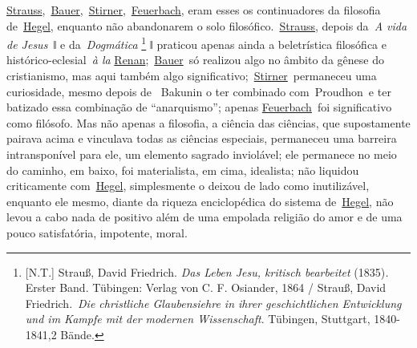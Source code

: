 \href{https://www.marxists.org/portugues/dicionario/verbetes/s/strauss_david.htm}{Strauss},~\href{https://www.marxists.org/portugues/dicionario/verbetes/b/bauer-b.htm}{Bauer},~\href{https://www.marxists.org/portugues/dicionario/verbetes/s/stirner.htm}{Stirner},~\href{https://www.marxists.org/portugues/dicionario/verbetes/f/feuerbach.htm}{Feuerbach},
eram esses os continuadores da filosofia
de~\href{https://www.marxists.org/portugues/dicionario/verbetes/h/hegel.htm}{Hegel},
enquanto não abandonarem o solo
filosófico.~\href{https://www.marxists.org/portugues/dicionario/verbetes/s/strauss_david.htm}{Strauss},
depois da~\emph{A vida de Jesus~}ǁ e
da~\emph{Dogmática}\protect\hypertarget{r27}{}{} \footnote{{[}N.T.{]}
  Strauß, David Friedrich. \emph{Das Leben Jesu, kritisch bearbeitet}
  (1835)\emph{.} Erster Band. Tübingen: Verlag von C. F. Osiander, 1864
  / Strauß, David Friedrich.~\emph{Die christliche Glaubensiehre in
  ihrer geschichtlichen Entwicklung und im Kampfe mit der modernen
  Wissenschaft}. Tübingen, Stuttgart, 1840-1841,2 Bände.} ǁ praticou
apenas ainda a beletrística filosófica e histórico-eclesial~\emph{à
la}\protect\hypertarget{r28}{}{}
\href{https://www.marxists.org/portugues/dicionario/verbetes/r/renan.htm}{Renan};~\href{https://www.marxists.org/portugues/dicionario/verbetes/b/bauer-b.htm}{Bauer}~só
realizou algo no âmbito da gênese do cristianismo, mas aqui também algo
significativo;~\href{https://www.marxists.org/portugues/dicionario/verbetes/s/stirner.htm}{Stirner}~permaneceu
uma curiosidade, mesmo depois de ~Bakunin o ter combinado com~Proudhon~e
ter batizado essa combinação de ``anarquismo''; apenas
\href{https://www.marxists.org/portugues/dicionario/verbetes/f/feuerbach.htm}{Feuerbach}~foi
significativo como filósofo. Mas não apenas a filosofia, a ciência das
ciências, que supostamente pairava acima e vinculava todas as ciências
especiais, permaneceu uma barreira intransponível para ele, um elemento
sagrado inviolável; ele permanece no meio do caminho, em baixo, foi
materialista, em cima, idealista; não liquidou criticamente
com~\href{https://www.marxists.org/portugues/dicionario/verbetes/h/hegel.htm}{Hegel},
simplesmente o deixou de lado como inutilizável, enquanto ele mesmo,
diante da riqueza enciclopédica do sistema
de~\href{https://www.marxists.org/portugues/dicionario/verbetes/h/hegel.htm}{Hegel},
não levou a cabo nada de positivo além de uma empolada religião do amor
e de uma pouco satisfatória, impotente, moral.

